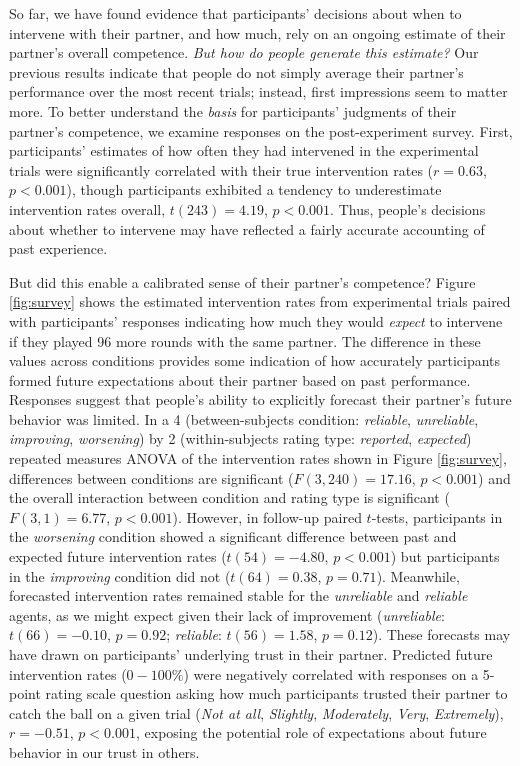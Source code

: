 \documentclass[10pt,letterpaper]{article}
\begin{document}
So far, we have found evidence that participants' decisions about when to intervene with their partner, and how much, rely on an ongoing estimate of their partner's overall competence. \textit{But how do people generate this estimate?} Our previous results indicate that people do not simply average their partner's performance over the most recent trials; instead, first impressions seem to matter more. To better understand the \textit{basis} for participants' judgments of their partner's competence, we examine responses on the post-experiment survey. First, participants' estimates of how often they had intervened in the experimental trials were significantly correlated with their true intervention rates ($r = 0.63$, $p < 0.001$), though participants exhibited a tendency to underestimate intervention rates overall, $t(243) = 4.19$, $p < 0.001$. Thus, people's decisions about whether to intervene may have reflected a fairly accurate accounting of past experience. 

But did this enable a calibrated sense of their partner's competence? Figure \ref{fig:survey} shows the estimated intervention rates from experimental trials paired with participants' responses indicating how much they would \textit{expect} to intervene if they played 96 more rounds with the same partner. The difference in these values across conditions provides some indication of how accurately participants formed future expectations about their partner based on past performance. Responses suggest that people's ability to explicitly forecast their partner's future behavior was limited. In a 4 (between-subjects condition: \textit{reliable}, \textit{unreliable}, \textit{improving}, \textit{worsening}) by 2 (within-subjects rating type: \textit{reported}, \textit{expected}) repeated measures ANOVA of the intervention rates shown in Figure \ref{fig:survey}, differences between conditions are significant ($F(3, 240) = 17.16$, $p < 0.001$) and the overall interaction between condition and rating type is significant ($F(3, 1) = 6.77$, $p < 0.001$). However, in follow-up paired $t$-tests, participants in the \textit{worsening} condition showed a significant difference between past and expected future intervention rates ($t(54) = -4.80$, $p < 0.001$) but participants in the \textit{improving} condition did not ($t(64) = 0.38$, $p = 0.71$). Meanwhile, forecasted intervention rates remained stable for the \textit{unreliable} and \textit{reliable} agents, as we might expect given their lack of improvement (\textit{unreliable}: $t(66) = -0.10$, $p = 0.92$; \textit{reliable}: $t(56) = 1.58$, $p = 0.12$). 
These forecasts may have drawn on participants' underlying trust in their partner. Predicted future intervention rates ($0-100\%$) were negatively correlated with responses on a 5-point rating scale question asking how much participants trusted their partner to catch the ball on a given trial (\textit{Not at all}, \textit{Slightly}, \textit{Moderately}, \textit{Very}, \textit{Extremely}), $r = -0.51$, $p < 0.001$, exposing the potential role of expectations about future behavior in our trust in others.
\end{document}
